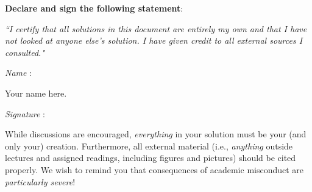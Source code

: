 
\textbf{Declare and sign the following statement}: 

\textit{``I certify that all solutions in this document are entirely my own and
that I have not looked at anyone else's solution.
I have given credit to all external sources I consulted."}

\textit{Name} :
\begin{solution}
Your name here.
\end{solution}

\textit{Signature} : \hrulefill

While discussions are encouraged, \emph{everything} in your solution must
be your (and only your) creation. Furthermore, all external material 
(i.e., \emph{anything} outside lectures and assigned
readings, including figures and pictures) should be cited properly.
We wish to remind you that consequences of academic misconduct are
\emph{particularly severe}!